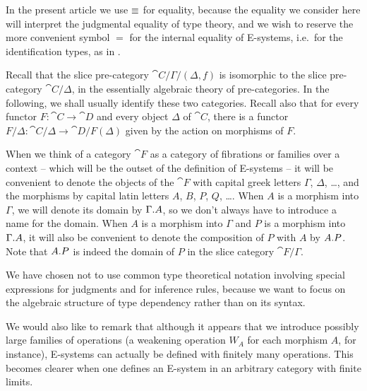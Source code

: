 \begin{rmk}
In the present article we use $\equiv$ for equality, because the equality we
consider here will interpret the judgmental equality of type theory, 
and we wish to reserve
the more convenient symbol $=$ for the internal equality of E-systems, i.e.~for
the identification types, as in \cite{TheBook}. 
\end{rmk}

\begin{rmk}
Recall that the slice pre-category $\cat{C}/\Gamma/(\Delta,f)$ is isomorphic to the slice pre-category
$\cat{C}/\Delta$, in the essentially algebraic theory of pre-categories. In the following,
we shall usually identify these two categories. Recall also that for every functor
$F:\cat{C}\to\cat{D}$ and every object $\Delta$ of $\cat{C}$, there is a functor
$F/\Delta:\cat{C}/\Delta\to \cat{D}/F(\Delta)$ given by the action on morphisms of $F$. 
\end{rmk}

\begin{rmk}
When we think of a category $\cat{F}$ as a category of fibrations or families
over a context -- which will be the outset of the definition of E-systems --
it will be convenient to denote the objects of the $\cat{F}$ with capital
greek letters $\Gamma$, $\Delta$, \ldots, and the morphisms by capital latin letters
$A$, $B$, $P$, $Q$, \ldots. When $A$ is a morphism into $\Gamma$, we will denote
its domain by $\ctxext{\Gamma}{A}$, so we don't always have to introduce a name
for the domain. When $A$ is a morphism into $\Gamma$ and
$P$ is a morphism into $\ctxext{\Gamma}{A}$, it will also be convenient to denote the
composition of $P$ with $A$ by $\ctxext{A}{P}$. Note that $\ctxext{A}{P}$
is indeed the domain of $P$ in the slice category $\cat{F}/\Gamma$.
\end{rmk}

\begin{rmk}
We have chosen not to use common type theoretical notation involving special
expressions for judgments and for inference rules, because we want to focus
on the algebraic structure of type dependency rather than on its syntax.

We would also like to remark that although it appears that we introduce possibly
large families of operations (a weakening operation $W_A$ for each morphism $A$,
for instance), E-systems can actually be defined with finitely many
operations. This becomes clearer when one defines an E-system in an arbitrary
category with finite limits.
\end{rmk}

